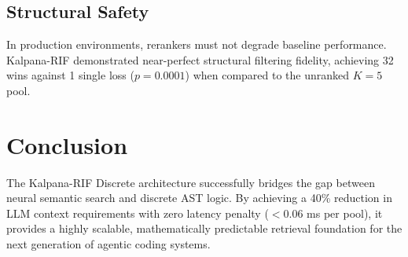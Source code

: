 \documentclass[11pt, a4paper]{article}
\begin{document}
\subsection{Structural Safety}
In production environments, rerankers must not degrade baseline performance. Kalpana-RIF demonstrated near-perfect structural filtering fidelity, achieving 32 wins against 1 single loss ($p = 0.0001$) when compared to the unranked $K=5$ pool.

\section{Conclusion}
The Kalpana-RIF Discrete architecture successfully bridges the gap between neural semantic search and discrete AST logic. By achieving a 40\% reduction in LLM context requirements with zero latency penalty ($< 0.06$ ms per pool), it provides a highly scalable, mathematically predictable retrieval foundation for the next generation of agentic coding systems.
\end{document}
